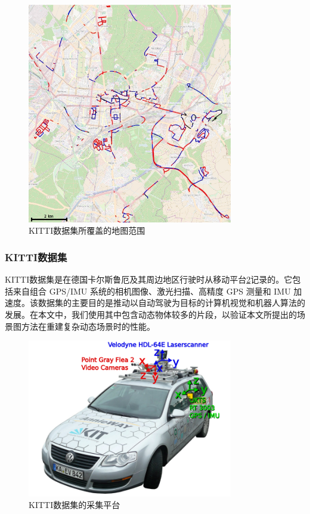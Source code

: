 \begin{figure}[ht]
    \centering
    \includegraphics[width=0.8\textwidth]{undergraduate-thesis/images/experiments/kitti-map.png}
    \caption{KITTI数据集所覆盖的地图范围}
    \label{fig:exp-kitti-map}
\end{figure}

\subsubsection{KITTI数据集}
KITTI数据集\cite{geiger_are_2012,geiger_vision_2013}是在德国卡尔斯鲁厄及其周边地区行驶时从移动平台\ref{fig:exp-kitti-platform}记录的。它包括来自组合 GPS/IMU 系统的相机图像、激光扫描、高精度 GPS 测量和 IMU 加速度。该数据集的主要目的是推动以自动驾驶为目标的计算机视觉和机器人算法的发展。在本文中，我们使用其中包含动态物体较多的片段，以验证本文所提出的场景图方法在重建复杂动态场景时的性能。
\begin{figure}[ht]
    \centering
    \includegraphics[width=0.8\textwidth]{undergraduate-thesis/images/experiments/kitti-platform.png}
    \caption{KITTI数据集的采集平台}
    \label{fig:exp-kitti-platform}
\end{figure}


